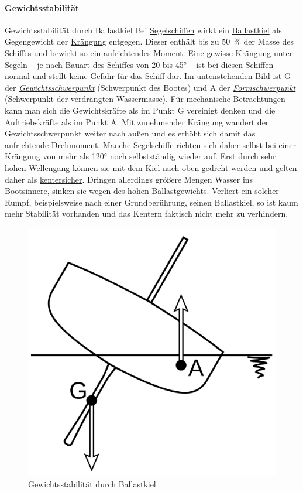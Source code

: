 \paragraph{Gewichtsstabilität}
Gewichtsstabilität durch Ballastkiel
Bei \href{https://de.wikipedia.org/wiki/Segelschiff}{Segelschiffen} wirkt ein \href{https://de.wikipedia.org/wiki/Kiel_(Schiffbau)}{Ballastkiel} als Gegengewicht der \href{https://de.wikipedia.org/wiki/Kr\%C3\%A4ngung}{Krängung} entgegen. Dieser enthält bis zu 50 \% der Masse des Schiffes und bewirkt so ein aufrichtendes Moment. Eine gewisse Krängung unter Segeln – je nach Bauart des Schiffes von 20 bis 45° – ist bei diesen Schiffen normal und stellt keine Gefahr für das Schiff dar. Im untenstehenden Bild ist G der \textit{\href{https://de.wikipedia.org/wiki/Gewichtsschwerpunkt}{Gewichtsschwerpunkt}} (Schwerpunkt des Bootes) und A der \textit{\href{https://de.wikipedia.org/wiki/Formschwerpunkt}{Formschwerpunkt}} (Schwerpunkt der verdrängten Wassermasse). Für mechanische Betrachtungen kann man sich die Gewichtskräfte als im Punkt G vereinigt denken und die Auftriebskräfte als im Punkt A. Mit zunehmender Krängung wandert der Gewichtsschwerpunkt weiter nach außen und es erhöht sich damit das aufrichtende \href{https://de.wikipedia.org/wiki/Drehmoment}{Drehmoment}. Manche Segelschiffe richten sich daher selbst bei einer Krängung von mehr als 120° noch selbstständig wieder auf. Erst durch sehr hohen \href{https://de.wikipedia.org/wiki/Seegang}{Wellengang} können sie mit dem Kiel nach oben gedreht werden und gelten daher als \href{https://de.wikipedia.org/wiki/Kentern}{kentersicher}. Dringen allerdings größere Mengen Wasser ins Bootsinnere, sinken sie wegen des hohen Ballastgewichts. Verliert ein solcher Rumpf, beispielsweise nach einer Grundberührung, seinen Ballastkiel, so ist kaum mehr Stabilität vorhanden und das Kentern faktisch nicht mehr zu verhindern. 
\begin{figure}
    \centering
    \includegraphics[width=0.5\linewidth]{Segeln_Gewichtsstabilitaet.svg.png}
    \caption{Gewichtsstabilität durch Ballastkiel }
    \label{fig:enter-label}
\end{figure}


